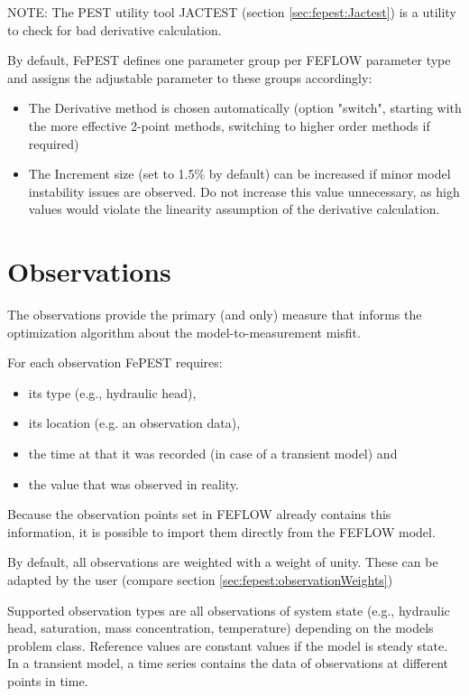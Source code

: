 NOTE: The PEST utility tool JACTEST (section \ref{sec:fepest:Jactest}) is a utility to check for bad derivative calculation.

By default, FePEST defines one parameter group per FEFLOW parameter type and assigns the adjustable parameter to these groups accordingly:

\begin{itemize}
\item The Derivative method is chosen automatically (option "switch", starting with the more effective 2-point methods, switching to higher order methods if required)

\item The Increment size (set to 1.5\% by default) can be increased if minor model instability issues are observed. Do not increase this value unnecessary, as high values would violate the linearity assumption of the derivative calculation.
\end{itemize}

\section{Observations}

The observations provide the primary (and only) measure that informs the optimization algorithm about the model-to-measurement misfit.

For each observation FePEST requires:

\begin{itemize}
\item its type (e.g., hydraulic head),
\item its location (e.g. an observation data),
\item the time at that it was recorded (in case of a transient model) and
\item the value that was observed in reality.
\end{itemize}

Because the observation points set in FEFLOW already contains this information, it is possible to import them directly from the FEFLOW model.

By default, all observations are weighted with a weight of unity. These can be adapted by the user (compare section \ref{sec:fepest:observationWeights})

Supported observation types are all observations of system state (e.g., hydraulic head, saturation, mass concentration, temperature) depending on the models problem class. Reference values are constant values if the model is steady state. In a transient model, a time series contains the data of observations at different points in time.

